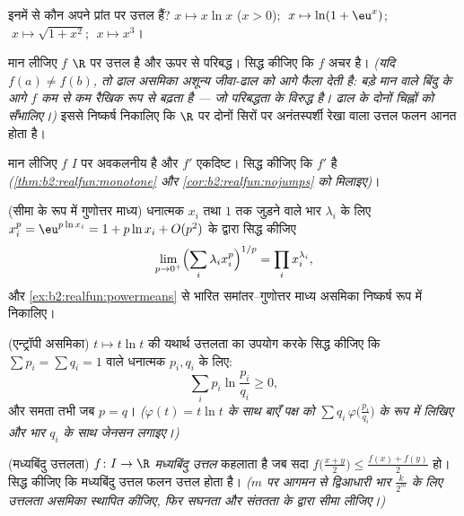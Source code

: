 \begin{exercise}[$\star$]\label{exo:b2:realfun:3}
इनमें से कौन अपने प्रांत पर उत्तल हैं? $x \mapsto
x\ln x$ ($x > 0$); $\;x \mapsto \ln(1 + \eu^x)$; $\;x \mapsto
\sqrt{1 + x^2}$; $\;x \mapsto x^3$।
\end{exercise}

\begin{exercise}[$\star\star$]\label{exo:b2:realfun:4}
मान लीजिए $f$ $\R$ पर उत्तल है और ऊपर से परिबद्ध। सिद्ध कीजिए कि $f$ अचर
है। \emph{(यदि $f(a) \neq f(b)$, तो ढाल असमिका अशून्य जीवा-ढाल को आगे फैला देती है:
बड़े मान वाले बिंदु के आगे $f$ कम से कम रैखिक रूप से बढ़ता है --- जो
परिबद्धता के विरुद्ध है। ढाल के दोनों चिह्नों को सँभालिए।)} इससे
निष्कर्ष निकालिए कि $\R$ पर दोनों सिरों पर अनंतस्पर्शी रेखा वाला उत्तल
फलन आनत होता है।
\end{exercise}

\begin{exercise}[$\star\star$]\label{exo:b2:realfun:5}
मान लीजिए $f$ $I$ पर अवकलनीय है और $f'$ एकदिष्ट। सिद्ध कीजिए कि $f'$ 
है \emph{(\cref{thm:b2:realfun:monotone} और \cref{cor:b2:realfun:nojumps} को मिलाइए)}।
\end{exercise}

\begin{exercise}[$\star\star$]\label{exo:b2:realfun:6}
(सीमा के रूप में गुणोत्तर माध्य) धनात्मक $x_i$ तथा $1$ तक जुड़ने वाले भार
$\lambda_i$ के लिए $x_i^p = \eu^{p\ln x_i} = 1 + p\ln x_i + O(p^2)$ के द्वारा सिद्ध कीजिए
\[
\lim_{p \to 0^+} \Bigl(\sum_i \lambda_i x_i^p\Bigr)^{1/p}
= \prod_i x_i^{\lambda_i} ,
\]
और \cref{ex:b2:realfun:powermeans} से भारित समांतर--गुणोत्तर माध्य असमिका निष्कर्ष रूप में निकालिए।
\end{exercise}

\begin{exercise}[$\star\star$]\label{exo:b2:realfun:7}
(एन्ट्रॉपी असमिका) $t \mapsto t\ln t$ की यथार्थ उत्तलता का उपयोग करके सिद्ध कीजिए कि
$\sum p_i = \sum q_i = 1$ वाले धनात्मक $p_i, q_i$ के लिए:
\[
\sum_i p_i \ln\frac{p_i}{q_i} \geq 0 ,
\]
और समता तभी जब $p = q$। \emph{($\varphi(t) = t\ln t$ के साथ बाएँ पक्ष को $\sum q_i\,
\varphi\bigl(\frac{p_i}{q_i}\bigr)$ के रूप में लिखिए
और भार $q_i$ के साथ जेनसन लगाइए।)}
\end{exercise}

\begin{exercise}[$\star\star\star$]\label{exo:b2:realfun:8}
(मध्यबिंदु उत्तलता) $f \colon I \to \R$ \emph{मध्यबिंदु उत्तल} कहलाता है जब सदा $f\bigl(\frac{x+y}{2}\bigr) \leq \frac{f(x) + f(y)}{2}$ हो।
सिद्ध कीजिए कि \emph{} मध्यबिंदु उत्तल फलन उत्तल होता है। \emph{($m$
पर आगमन से द्विआधारी भार $\frac{k}{2^m}$ के लिए उत्तलता असमिका स्थापित कीजिए, फिर
सघनता और संततता के द्वारा सीमा लीजिए।)}
\end{exercise}

